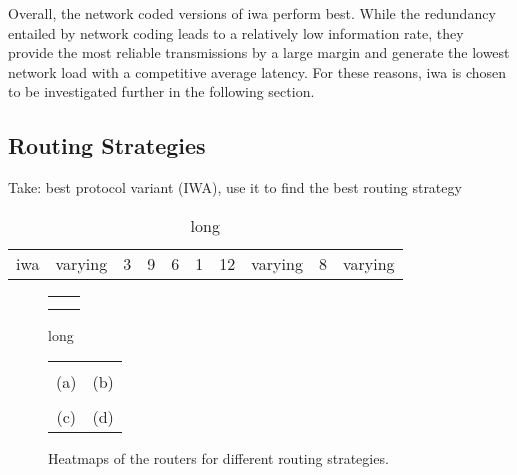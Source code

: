 Overall, the network coded versions of \gls{iwa} perform best. While the redundancy entailed by network coding leads to a relatively low information
rate, they provide the most reliable transmissions by a large margin and generate the lowest network load with a competitive average latency. For
these reasons, \gls{iwa} is chosen to be investigated further in the following section.

\subsection{Routing Strategies}
Take: best protocol variant (IWA), use it to find the best routing strategy

\begin{table}
    \centering
    \begin{tabulary}{\textwidth}{C|C|C|C|C|C|C|C|C|C}
        \pProtVar{} & \pNCMode{} & \pEncMods{} & \pAuthMods{} & \pRQSize{} & \pARQLimit{} & \pARQTimeout{} & \pRStrat{} & \pAttackerSet{} & \pAttackProb{} \\\hline
        \gls{iwa} & varying & 3 & 9 & 6 & 1 & 12 & varying & 8 & varying \\
    \end{tabulary}
    \caption[Input parameters for routing strategies experiment]{long}
    \label{tab:setuproutingstratexperiment}
\end{table}

\begin{figure}
    \begin{tabular}{cc}
         &  \\
         & 
    \end{tabular}
    \caption[Results for routing strategies experiment]{long}
    \label{fig:resultsroutingstratsexperiment}
\end{figure}

\begin{figure}
    \begin{tabular}{cc}
         &  \\
        (a) & (b) \\
         &  \\
        (c) & (d) \\
    \end{tabular}
    \caption[Heatmaps of the routers for different routing strategies]{Heatmaps of the routers for different routing strategies.}
    \label{fig:resultsroutingstratheatmaps}
\end{figure}

